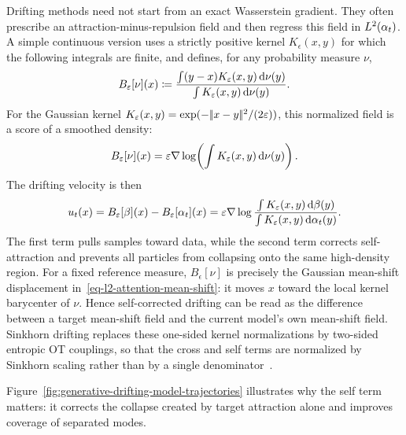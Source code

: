 Drifting methods need not start from an exact Wasserstein gradient. They often prescribe an attraction-minus-repulsion field and then regress this field in $L^2(\alpha_t)$. A simple continuous version uses a strictly positive kernel $K_\epsilon(x,y)$ for which the following integrals are finite, and defines, for any probability measure $\nu$,
\begin{equation}\label{eq-normalized-kernel-drift}
	B_\varepsilon[\nu](x)
	\coloneqq
	\frac{\int (y-x)K_\varepsilon(x,y)\,\mathrm{d}\nu(y)}
	     {\int K_\varepsilon(x,y)\,\mathrm{d}\nu(y)}.
\end{equation}
For the Gaussian kernel
$K_\varepsilon(x,y)=\exp(-|\!| x-y |\!|^2/(2\varepsilon))$, this normalized field is a score of a smoothed density:
\begin{equation}\label{eq-normalized-kernel-score}
	B_\varepsilon[\nu](x)
	=
	\varepsilon\nabla\log\!\left(\int K_\varepsilon(x,y)\,\mathrm{d}\nu(y)\right).
\end{equation}
The drifting velocity is then
\begin{equation}\label{eq-cross-minus-self-drift}
	u_t(x)=B_\varepsilon[\beta](x)-B_\varepsilon[\alpha_t](x)
	=
	\varepsilon\nabla\log
	\frac{\int K_\varepsilon(x,y)\,\mathrm{d}\beta(y)}
	     {\int K_\varepsilon(x,y)\,\mathrm{d}\alpha_t(y)}.
\end{equation}
The first term pulls samples toward data, while the second term corrects self-attraction and prevents all particles from collapsing onto the same high-density region. For a fixed reference measure, \(B_\epsilon[\nu]\) is precisely the Gaussian mean-shift displacement in~\eqref{eq-l2-attention-mean-shift}: it moves $x$ toward the local kernel barycenter of $\nu$. Hence self-corrected drifting can be read as the difference between a target mean-shift field and the current model's own mean-shift field. Sinkhorn drifting replaces these one-sided kernel normalizations by two-sided entropic OT couplings, so that the cross and self terms are normalized by Sinkhorn scaling rather than by a single denominator~\cite{He2026SinkhornDrifting}.


Figure~\ref{fig:generative-drifting-model-trajectories} illustrates why the self term matters: it corrects the collapse created by target attraction alone and improves coverage of separated modes.

